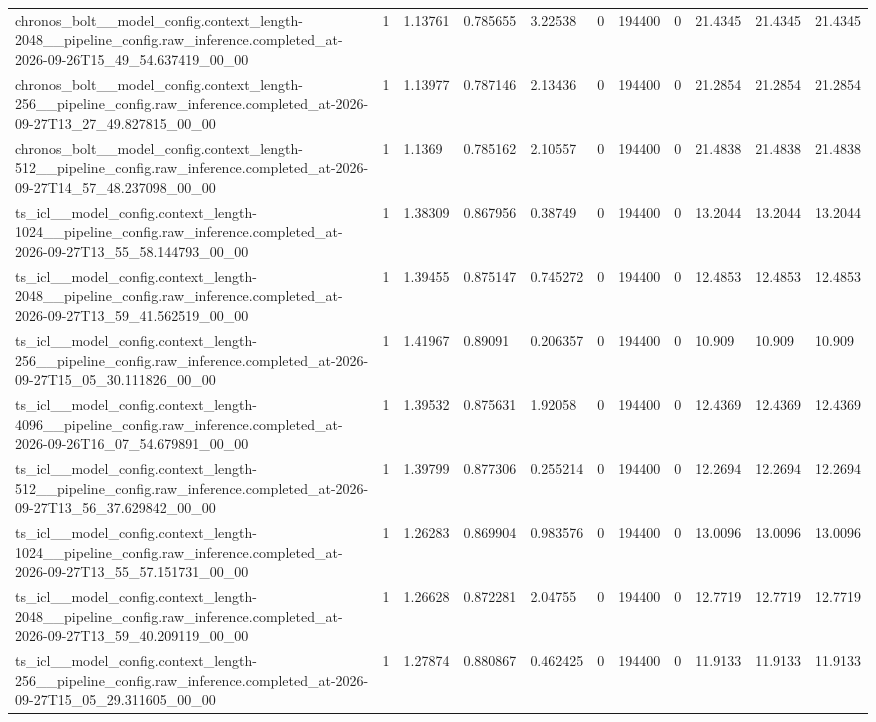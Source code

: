 \begin{tabular}{lllllllllll}
chronos\_bolt\_\_model\_config.context\_length-2048\_\_pipeline\_config.raw\_inference.completed\_at-2026-09-26T15\_49\_54.637419\_00\_00 & 1 & 1.13761 & 0.785655 & 3.22538 & 0 & 194400 & 0 & 21.4345 & 21.4345 & 21.4345 \\
chronos\_bolt\_\_model\_config.context\_length-256\_\_pipeline\_config.raw\_inference.completed\_at-2026-09-27T13\_27\_49.827815\_00\_00 & 1 & 1.13977 & 0.787146 & 2.13436 & 0 & 194400 & 0 & 21.2854 & 21.2854 & 21.2854 \\
chronos\_bolt\_\_model\_config.context\_length-512\_\_pipeline\_config.raw\_inference.completed\_at-2026-09-27T14\_57\_48.237098\_00\_00 & 1 & 1.1369 & 0.785162 & 2.10557 & 0 & 194400 & 0 & 21.4838 & 21.4838 & 21.4838 \\
ts\_icl\_\_model\_config.context\_length-1024\_\_pipeline\_config.raw\_inference.completed\_at-2026-09-27T13\_55\_58.144793\_00\_00 & 1 & 1.38309 & 0.867956 & 0.38749 & 0 & 194400 & 0 & 13.2044 & 13.2044 & 13.2044 \\
ts\_icl\_\_model\_config.context\_length-2048\_\_pipeline\_config.raw\_inference.completed\_at-2026-09-27T13\_59\_41.562519\_00\_00 & 1 & 1.39455 & 0.875147 & 0.745272 & 0 & 194400 & 0 & 12.4853 & 12.4853 & 12.4853 \\
ts\_icl\_\_model\_config.context\_length-256\_\_pipeline\_config.raw\_inference.completed\_at-2026-09-27T15\_05\_30.111826\_00\_00 & 1 & 1.41967 & 0.89091 & 0.206357 & 0 & 194400 & 0 & 10.909 & 10.909 & 10.909 \\
ts\_icl\_\_model\_config.context\_length-4096\_\_pipeline\_config.raw\_inference.completed\_at-2026-09-26T16\_07\_54.679891\_00\_00 & 1 & 1.39532 & 0.875631 & 1.92058 & 0 & 194400 & 0 & 12.4369 & 12.4369 & 12.4369 \\
ts\_icl\_\_model\_config.context\_length-512\_\_pipeline\_config.raw\_inference.completed\_at-2026-09-27T13\_56\_37.629842\_00\_00 & 1 & 1.39799 & 0.877306 & 0.255214 & 0 & 194400 & 0 & 12.2694 & 12.2694 & 12.2694 \\
ts\_icl\_\_model\_config.context\_length-1024\_\_pipeline\_config.raw\_inference.completed\_at-2026-09-27T13\_55\_57.151731\_00\_00 & 1 & 1.26283 & 0.869904 & 0.983576 & 0 & 194400 & 0 & 13.0096 & 13.0096 & 13.0096 \\
ts\_icl\_\_model\_config.context\_length-2048\_\_pipeline\_config.raw\_inference.completed\_at-2026-09-27T13\_59\_40.209119\_00\_00 & 1 & 1.26628 & 0.872281 & 2.04755 & 0 & 194400 & 0 & 12.7719 & 12.7719 & 12.7719 \\
ts\_icl\_\_model\_config.context\_length-256\_\_pipeline\_config.raw\_inference.completed\_at-2026-09-27T15\_05\_29.311605\_00\_00 & 1 & 1.27874 & 0.880867 & 0.462425 & 0 & 194400 & 0 & 11.9133 & 11.9133 & 11.9133 \\

\end{tabular}

